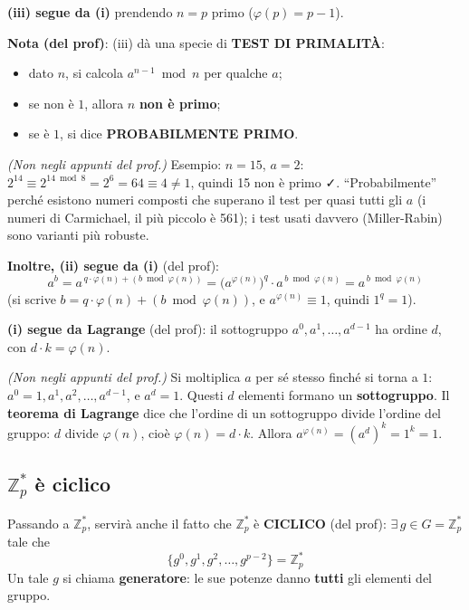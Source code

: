 \textbf{(iii) segue da (i)} prendendo \(n = p\) primo (\(\varphi(p) = p - 1\)).

\textbf{Nota (del prof)}: (iii) dà una specie di \textbf{TEST DI PRIMALITÀ}:
\begin{itemize}
  \item dato \(n\), si calcola \(a^{n-1} \bmod n\) per qualche \(a\);
  \item se non è \(1\), allora \(n\) \textbf{non è primo};
  \item se è \(1\), si dice \textbf{PROBABILMENTE PRIMO}.
\end{itemize}

\emph{(Non negli appunti del prof.)} Esempio: \(n = 15\), \(a = 2\): \(2^{14} \equiv 2^{14 \bmod 8} = 2^6 = 64 \equiv 4 \ne 1\), quindi 15 non è primo ✓. ``Probabilmente'' perché esistono numeri composti che superano il test per quasi tutti gli \(a\) (i numeri di Carmichael, il più piccolo è 561); i test usati davvero (Miller-Rabin) sono varianti più robuste.

\textbf{Inoltre, (ii) segue da (i)} (del prof):
\[
a^b = a^{\,q \cdot \varphi(n) + (b \bmod \varphi(n))} = \big(a^{\varphi(n)}\big)^q \cdot a^{\,b \bmod \varphi(n)} = a^{\,b \bmod \varphi(n)}
\]
(si scrive \(b = q \cdot \varphi(n) + (b \bmod \varphi(n))\), e \(a^{\varphi(n)} \equiv 1\), quindi \(1^q = 1\)).

\textbf{(i) segue da Lagrange} (del prof): il sottogruppo \(a^0, a^1, \dots, a^{d-1}\) ha ordine \(d\), con \(d \cdot k = \varphi(n)\).

\begin{nota}
\emph{(Non negli appunti del prof.)} Si moltiplica \(a\) per sé stesso finché si torna a \(1\): \(a^0 = 1, a^1, a^2, \dots, a^{d-1}\), e \(a^d = 1\). Questi \(d\) elementi formano un \textbf{sottogruppo}. Il \textbf{teorema di Lagrange} dice che l'ordine di un sottogruppo divide l'ordine del gruppo: \(d\) divide \(\varphi(n)\), cioè \(\varphi(n) = d \cdot k\). Allora \(a^{\varphi(n)} = (a^d)^k = 1^k = 1\).
\end{nota}

\subsection{\texorpdfstring{\(\mathbb{Z}_p^*\)}{Zp*} è ciclico}

Passando a \(\mathbb{Z}_p^*\), servirà anche il fatto che \(\mathbb{Z}_p^*\) è \textbf{CICLICO} (del prof): \(\exists\, g \in G = \mathbb{Z}_p^*\) tale che
\[
\{g^0, g^1, g^2, \dots, g^{p-2}\} = \mathbb{Z}_p^*
\]
Un tale \(g\) si chiama \textbf{generatore}: le sue potenze danno \textbf{tutti} gli elementi del gruppo.

